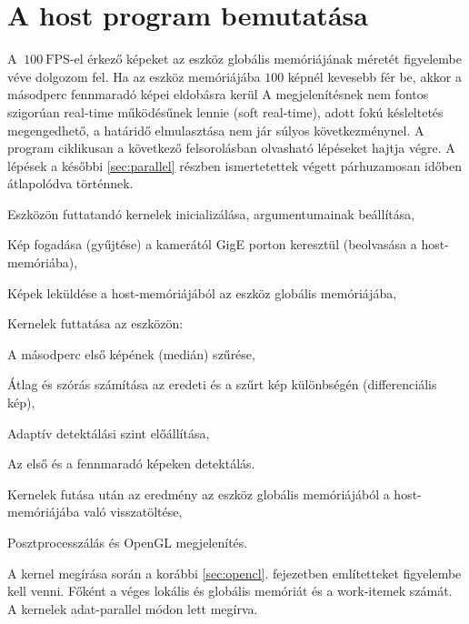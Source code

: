 \chapter{A host program bemutatása}
	A $~100\ \mathrm{FPS}$-el érkező képeket az eszköz globális memóriájának méretét figyelembe véve dolgozom fel.
	Ha az eszköz memóriájába $100$ képnél kevesebb fér be, akkor a másodperc fennmaradó képei eldobásra kerül 
	A megjelenítésnek nem fontos szigorúan real-time működésűnek lennie (soft real-time), adott fokú késleltetés megengedhető, a
	határidő elmulasztása nem jár súlyos következménynel. A program ciklikusan a következő felsorolásban olvasható lépéseket hajtja
	végre. A lépések a későbbi \ref{sec:parallel} részben ismertetettek végett párhuzamosan időben átlapolódva történnek. 
	\begin{enumerate*}
		\item Eszközön futtatandó kernelek inicializálása, argumentumainak beállítása,
		\item Kép fogadása (gyűjtése) a kamerától GigE porton keresztül (beolvasása a host-memóriába),
		\item Képek leküldése a host-memóriájából az eszköz globális memóriájába,
		\item Kernelek futtatása az eszközön:
		\begin{enumerate*}
			\item A másodperc első képének (medián) szűrése,
			\item Átlag és szórás számítása az eredeti és a szűrt kép különbségén (differenciális kép),
			\item Adaptív detektálási szint előállítása,
			\item Az első és a fennmaradó képeken detektálás.
		\end{enumerate*}
		\item Kernelek futása után az eredmény az eszköz globális memóriájából a host-memóriájába való
		visszatöltése,
		\item Posztprocesszálás és OpenGL megjelenítés.
	\end{enumerate*}
	A kernel megírása során a korábbi \ref{sec:opencl}. fejezetben említetteket figyelembe kell venni.
	Főként a véges lokális és globális memóriát és a work-itemek számát. A kernelek adat-parallel módon lett megírva.
	
